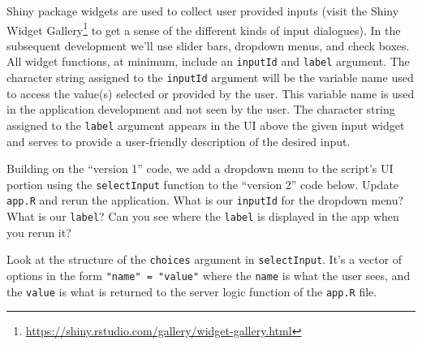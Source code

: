 \documentclass[
]{krantz}
\renewcommand{\href}[2]{#2\footnote{\url{#1}}}
\begin{document}
Shiny package widgets are used to collect user provided inputs (visit the \href{https://shiny.rstudio.com/gallery/widget-gallery.html}{Shiny Widget Gallery} to get a sense of the different kinds of input dialogues). In the subsequent development we'll use slider bars, dropdown menus, and check boxes. All widget functions, at minimum, include an \texttt{inputId} and \texttt{label} argument. The character string assigned to the \texttt{inputId} argument will be the variable name used to access the value(s) selected or provided by the user. This variable name is used in the application development and not seen by the user. The character string assigned to the \texttt{label} argument appears in the UI above the given input widget and serves to provide a user-friendly description of the desired input.

Building on the ``version 1'' code, we add a dropdown menu to the script's UI portion using the \texttt{selectInput} function to the ``version 2'' code below. Update \texttt{app.R} and rerun the application. What is our \texttt{inputId} for the dropdown menu? What is our \texttt{label}? Can you see where the \texttt{label} is displayed in the app when you rerun it?

Look at the structure of the \texttt{choices} argument in \texttt{selectInput}. It's a vector of options in the form \texttt{"name"\ =\ "value"} where the \texttt{name} is what the user sees, and the \texttt{value} is what is returned to the server logic function of the \texttt{app.R} file.
\end{document}
